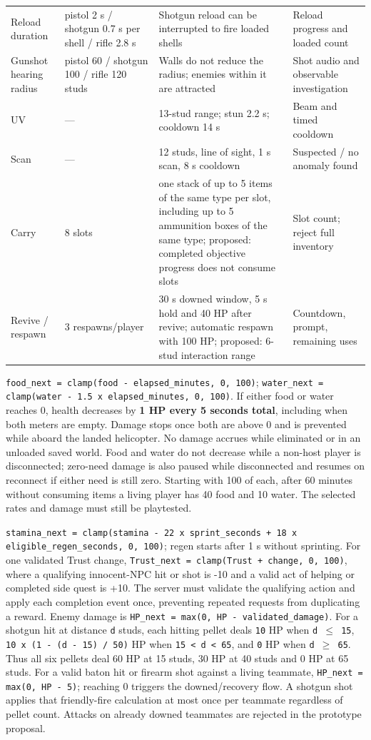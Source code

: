 \begin{longtable}{@{}p{}p{}p{}p{}@{}}
Reload duration & pistol 2 s / shotgun 0.7 s per shell / rifle 2.8 s & Shotgun reload can be interrupted to fire loaded shells & Reload progress and loaded count \\
Gunshot hearing radius & pistol 60 / shotgun 100 / rifle 120 studs & Walls do not reduce the radius; enemies within it are attracted & Shot audio and observable investigation \\
UV & --- & 13-stud range; stun 2.2 s; cooldown 14 s & Beam and timed cooldown \\
Scan & --- & 12 studs, line of sight, 1 s scan, 8 s cooldown & Suspected / no anomaly found \\
Carry & 8 slots & one stack of up to 5 items of the same type per slot, including up to 5 ammunition boxes of the same type; proposed: completed objective progress does not consume slots & Slot count; reject full inventory \\
Revive / respawn & 3 respawns/player & 30 s downed window, 5 s hold and 40 HP after revive; automatic respawn with 100 HP; proposed: 6-stud interaction range & Countdown, prompt, remaining uses \\
\bottomrule
\end{longtable}
\texttt{food\_next = clamp(food - elapsed\_minutes, 0, 100)}; \texttt{water\_next = clamp(water - 1.5  x  elapsed\_minutes, 0, 100)}. If either food or water reaches 0, health decreases by \textbf{1 HP every 5 seconds total}, including when both meters are empty. Damage stops once both are above 0 and is prevented while aboard the landed helicopter. No damage accrues while eliminated or in an unloaded saved world. Food and water do not decrease while a non-host player is disconnected; zero-need damage is also paused while disconnected and resumes on reconnect if either need is still zero. Starting with 100 of each, after 60 minutes without consuming items a living player has 40 food and 10 water. The selected rates and damage must still be playtested.

\texttt{stamina\_next = clamp(stamina - 22  x  sprint\_seconds + 18  x  eligible\_regen\_seconds, 0, 100)}; regen starts after 1 s without sprinting. For one validated Trust change, \texttt{Trust\_next = clamp(Trust + change, 0, 100)}, where a qualifying innocent-NPC hit or shot is -10 and a valid act of helping or completed side quest is +10. The server must validate the qualifying action and apply each completion event once, preventing repeated requests from duplicating a reward. Enemy damage is \texttt{HP\_next = max(0, HP - validated\_damage)}. For a shotgun hit at distance \texttt{d} studs, each hitting pellet deals \texttt{10} HP when \texttt{d $\leq$ 15}, \texttt{10  x  (1 - (d - 15) / 50)} HP when \texttt{15 < d < 65}, and \texttt{0} HP when \texttt{d $\geq$ 65}. Thus all six pellets deal 60 HP at 15 studs, 30 HP at 40 studs and 0 HP at 65 studs. For a valid baton hit or firearm shot against a living teammate, \texttt{HP\_next = max(0, HP - 5)}; reaching 0 triggers the downed/recovery flow. A shotgun shot applies that friendly-fire calculation at most once per teammate regardless of pellet count. Attacks on already downed teammates are rejected in the prototype proposal.

